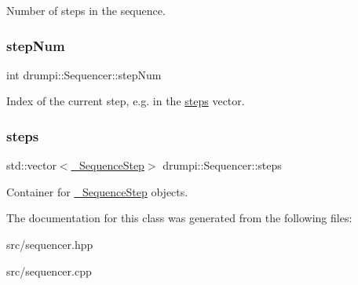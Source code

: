 Number of steps in the sequence. \mbox{\label{classdrumpi_1_1Sequencer_a259a1eb2adc67dc949c2cdb45358886d}} 
\subsubsection{\texorpdfstring{step\+Num}{stepNum}}
{\footnotesize\ttfamily int drumpi\+::\+Sequencer\+::step\+Num\hspace{0.3cm}{\ttfamily [private]}}

Index of the current step, e.\+g. in the \hyperlink{classdrumpi_1_1Sequencer_a756f8ef45e87ef2165d7e34752c9bf7e}{steps} vector. \mbox{\label{classdrumpi_1_1Sequencer_a756f8ef45e87ef2165d7e34752c9bf7e}} 
\subsubsection{\texorpdfstring{steps}{steps}}
{\footnotesize\ttfamily std\+::vector$<$\hyperlink{classdrumpi_1_1__SequenceStep}{\+\_\+\+Sequence\+Step}$>$ drumpi\+::\+Sequencer\+::steps\hspace{0.3cm}{\ttfamily [private]}}

Container for \hyperlink{classdrumpi_1_1__SequenceStep}{\+\_\+\+Sequence\+Step} objects. 

The documentation for this class was generated from the following files\+:\begin{DoxyCompactItemize}
\item 
src/sequencer.\+hpp\item 
src/sequencer.\+cpp\end{DoxyCompactItemize}
